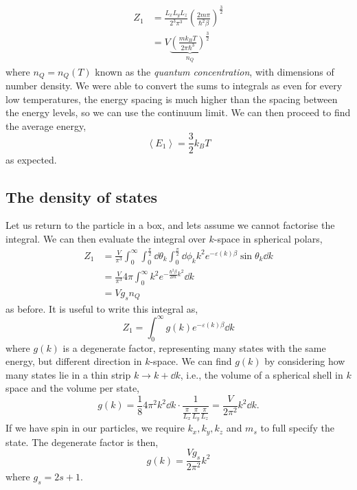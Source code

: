 \documentclass{book}
\begin{document}
\begin{equation}
	\begin{split}
	Z_1 &= \frac{L_xL_yL_z}{2^3\pi^3}\left(\frac{2m\pi}{\hbar^2\beta}\right)^{\frac{3}{2}} \\
	& = V\underbrace{\left(\frac{mk_BT}{2\pi\hbar^3}\right)^{\frac{3}{2}}}_{n_Q}
\end{split}
\end{equation}
where $n_Q = n_Q(T)$ known as the \textit{quantum concentration}, with dimensions of number density. We were able to convert the sums to integrals as even for every low temperatures, the energy spacing is much higher than the spacing between the energy levels, so we can use the continuum limit. We can then proceed to find the average energy,
\begin{equation}
	\left<E_1\right> = \frac{3}{2}k_BT
\end{equation}
as expected.
\subsection{The density of states}
Let us return to the particle in a box, and lets assume we cannot factorise the integral. We can then evaluate the integral over $k$-space in spherical polars,
\begin{equation}
	\begin{split}
	Z_1 &= \frac{V}{\pi^3}\int_0^{\infty}\int_0^{\frac{\pi}{2}}\dd{\theta}_k\int_0^{\frac{\pi}{2}}\dd{\phi}_kk^2e^{-\varepsilon(k)\beta}\sin\theta_k\dd{k} \\
	& = \frac{V}{\pi^3}4\pi\int_0^{\infty}k^2e^{-\frac{\hbar^2\beta}{2m}k^2}\dd{k} \\
	& = Vg_sn_Q
	\end{split}
\end{equation}
as before. It is useful to write this integral as,
\begin{equation}
	Z_1 = \int_0^{\infty}g(k) e^{-\varepsilon(k)\beta}\dd{k}
\end{equation}
where $g(k)$ is a degenerate factor, representing many states with the same energy, but different direction in $k$-space. We can find $g(k)$ by considering how many states lie in a thin strip $k \to k + \dd{k}$, i.e., the volume of a spherical shell in $k$ space and the volume per state,
\begin{equation}
	g(k) = \frac{1}{8}4\pi^2k^2\dd{k}\cdot \frac{1}{\frac{\pi}{L_x}\frac{\pi}{L_y}\frac{\pi}{L_z}} = \frac{V}{2\pi^2}k^2\dd{k}.
\end{equation}
If we have spin in our particles, we require $k_x,k_y,k_z$ and $m_s$ to full specify the state. The degenerate factor is then,
\begin{equation}
	g(k) = \frac{Vg_s}{2\pi^2}k^2	
\end{equation}
where $g_s = 2s+1$.
\end{document}
